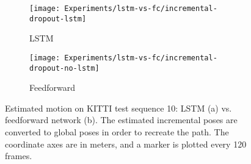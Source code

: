 		\begin{figure}
			\centering
			\begin{subfigure}[b]{0.5\linewidth}
				\centering
				\texttt{[image: Experiments/lstm-vs-fc/incremental-dropout-lstm]}
				\caption{
					LSTM
					\label{fig:kitti-sequence-10-lstm}
				}
			\end{subfigure}%
			\begin{subfigure}[b]{0.5\linewidth}
				\centering
				\texttt{[image: Experiments/lstm-vs-fc/incremental-dropout-no-lstm]}
				\caption{
					Feedforward
					\label{fig:fig:kitti-sequence-10-no-lstm}
				}
			\end{subfigure}%
			\caption[Estimated motion on KITTI test sequence 10: LSTM vs. feedforward network]
					{Estimated motion on KITTI test sequence 10: LSTM (a) vs. feedforward network (b).
					 The estimated incremental poses are converted to global poses in order to recreate the path.
					 The coordinate axes are in meters, and a marker is plotted every 120 frames.
					 \label{fig:kitti-test-sequence-10-lstm-vs-no-lstm}}
		\end{figure}
		
